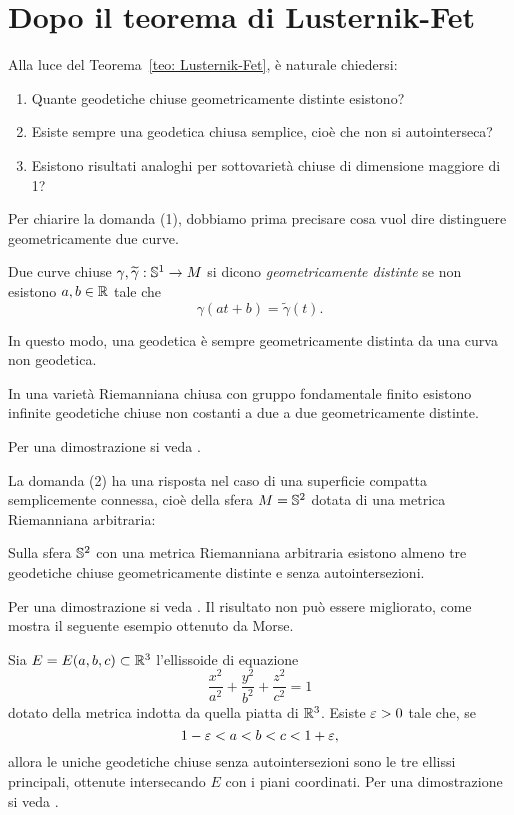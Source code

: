 \section{Dopo il teorema di Lusternik-Fet}

Alla luce del Teorema~\ref{teo: Lusternik-Fet}, è naturale chiedersi:
\begin{enumerate}[label=(\arabic*)]
	\item Quante geodetiche chiuse geometricamente distinte esistono?
	\item Esiste sempre una geodetica chiusa semplice, cioè che non si autointerseca?
	\item Esistono risultati analoghi per sottovarietà chiuse di dimensione maggiore di 1?
\end{enumerate}

Per chiarire la domanda (1), dobbiamo prima precisare cosa vuol dire distinguere geometricamente due curve. 
\begin{defi}
	Due curve chiuse \(\gamma, \widetilde{\gamma} : \mathbb{S}^1 \to M\) si dicono \textit{geometricamente distinte} se non esistono \(a,b \in \mathbb{R}\) tale che
	\[
		\gamma(at+b) = \widetilde{\gamma}(t).
	\]
\end{defi}
In questo modo, una geodetica è sempre geometricamente distinta da una curva non geodetica. 
\begin{teo}
	In una varietà Riemanniana chiusa con gruppo fondamentale finito esistono infinite geodetiche chiuse non costanti a due a due geometricamente distinte.
\end{teo}
Per una dimostrazione si veda \cite[Theorem 4.3.5]{klingenberg2012lectures}.

La domanda (2) ha una risposta nel caso di una superficie compatta semplicemente connessa, cioè della sfera \(M=\mathbb{S}^2\) dotata di una metrica Riemanniana arbitraria:
\begin{teo}
	Sulla sfera \(\mathbb{S}^2\) con una metrica Riemanniana arbitraria esistono almeno tre geodetiche chiuse geometricamente distinte e senza autointersezioni.
\end{teo}
Per una dimostrazione si veda \cite[Theorem A.3.1]{klingenberg2012lectures}. Il risultato non può essere migliorato, come mostra il seguente esempio ottenuto da Morse.
\begin{es}[Morse]
	Sia \(E=E(a,b,c) \subset \mathbb{R}^3\) l'ellissoide di equazione
	\[
		\frac{x^2}{a^2}+\frac{y^2}{b^2}+\frac{z^2}{c^2}=1
	\] 
	dotato della metrica indotta da quella piatta di \(\mathbb{R}^3\). Esiste \(\varepsilon >0\) tale che, se 
	\[
		1-\varepsilon < a < b < c < 1+\varepsilon,
	\]
	allora le uniche geodetiche chiuse senza autointersezioni sono le tre ellissi principali, ottenute intersecando \(E\) con i piani coordinati. Per una dimostrazione si veda \cite[Proposition 5.1.2]{klingenberg2012lectures}.
\end{es}


